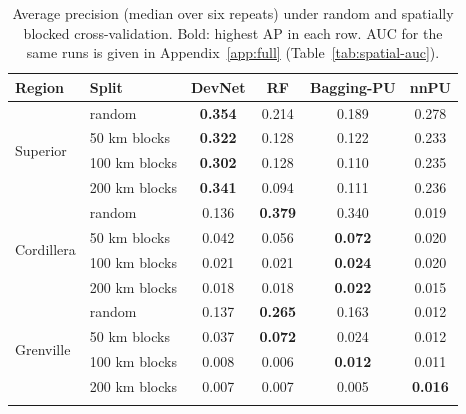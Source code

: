 \documentclass[pdflatex,sn-apa]{sn-jnl}
\begin{document}
\begin{table}[t]
\caption{Average precision (median over six repeats) under random and spatially blocked cross-validation. Bold: highest AP in each row. AUC for the same runs is given in Appendix~\ref{app:full} (Table~\ref{tab:spatial-auc}).}\label{tab:spatial}
\footnotesize
\setlength{\tabcolsep}{3pt}
\begin{tabular*}{\textwidth}{@{\extracolsep\fill}llcccc}
\toprule
Region & Split & DevNet & RF & Bagging-PU & nnPU \\
\midrule
\multirow{4}{*}{Superior} & random & \textbf{0.354} & 0.214 & 0.189 & 0.278 \\
 & 50 km blocks & \textbf{0.322} & 0.128 & 0.122 & 0.233 \\
 & 100 km blocks & \textbf{0.302} & 0.128 & 0.110 & 0.235 \\
 & 200 km blocks & \textbf{0.341} & 0.094 & 0.111 & 0.236 \\
\midrule
\multirow{4}{*}{Cordillera} & random & 0.136 & \textbf{0.379} & 0.340 & 0.019 \\
 & 50 km blocks & 0.042 & 0.056 & \textbf{0.072} & 0.020 \\
 & 100 km blocks & 0.021 & 0.021 & \textbf{0.024} & 0.020 \\
 & 200 km blocks & 0.018 & 0.018 & \textbf{0.022} & 0.015 \\
\midrule
\multirow{4}{*}{Grenville} & random & 0.137 & \textbf{0.265} & 0.163 & 0.012 \\
 & 50 km blocks & 0.037 & \textbf{0.072} & 0.024 & 0.012 \\
 & 100 km blocks & 0.008 & 0.006 & \textbf{0.012} & 0.011 \\
 & 200 km blocks & 0.007 & 0.007 & 0.005 & \textbf{0.016} \\
\botrule
\end{tabular*}
\end{table}
\end{document}
